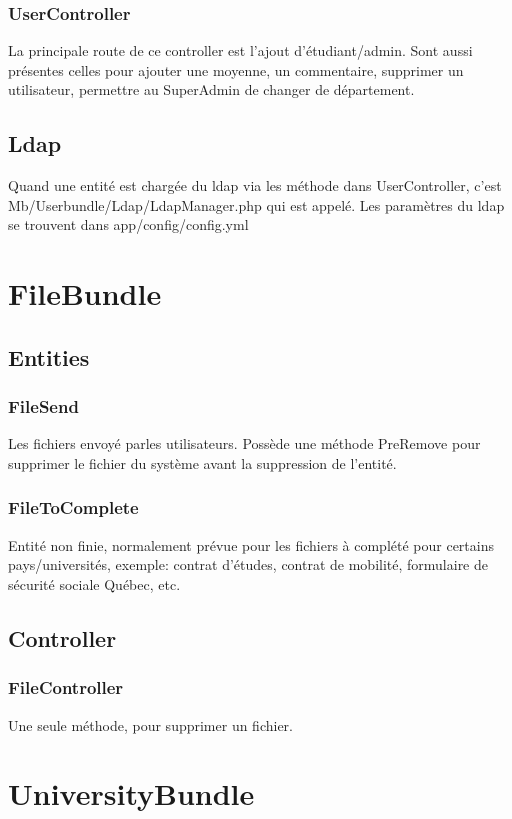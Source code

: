 \subsubsection{UserController}
La principale route de ce controller est l'ajout d'étudiant/admin.
Sont aussi présentes celles pour ajouter une moyenne, un commentaire, supprimer un utilisateur, permettre au SuperAdmin de changer de département.


\subsection{Ldap}
Quand une entité est chargée du ldap via les méthode dans UserController, c'est Mb/Userbundle/Ldap/LdapManager.php qui est appelé.
Les paramètres du ldap se trouvent dans app/config/config.yml


\section{FileBundle}
\subsection{Entities}
\subsubsection{FileSend}
Les fichiers envoyé parles utilisateurs. Possède une méthode PreRemove pour supprimer le fichier du système avant la suppression de l'entité.

\subsubsection{FileToComplete}
Entité non finie, normalement prévue pour les fichiers à complété pour certains pays/universités, exemple: contrat d'études, contrat de mobilité, formulaire de sécurité sociale Québec, etc.


\subsection{Controller}
\subsubsection{FileController}
Une seule méthode, pour supprimer un fichier.


\section{UniversityBundle}
